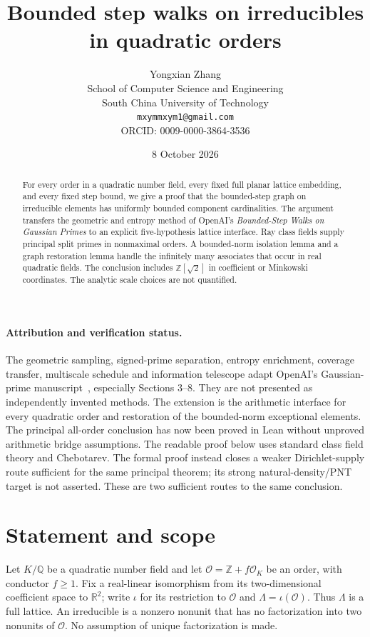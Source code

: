 \documentclass[11pt]{article}
\title{Bounded step walks on irreducibles in quadratic orders}
\author{Yongxian Zhang\\[2pt]\small School of Computer Science and Engineering\\\small South China University of Technology\\\small\texttt{mxymmxym1@gmail.com}\\\small ORCID: 0009-0000-3864-3536}
\date{8 October 2026}
\numberwithin{equation}{section}
\theoremstyle{definition}\newtheorem{definition}[theorem]{Definition}
\theoremstyle{remark}\newtheorem{remark}[theorem]{Remark}
\newcommand{\Z}{\mathbb Z}\newcommand{\Q}{\mathbb Q}\newcommand{\R}{\mathbb R}
\newcommand{\OO}{\mathcal O}\newcommand{\PP}{\mathcal P}
\begin{document}
\maketitle
\begin{abstract}
For every order in a quadratic number field, every fixed full planar lattice embedding, and every fixed step bound, we give a proof that the bounded-step graph on irreducible elements has uniformly bounded component cardinalities. The argument transfers the geometric and entropy method of OpenAI's \emph{Bounded-Step Walks on Gaussian Primes} to an explicit five-hypothesis lattice interface. Ray class fields supply principal split primes in nonmaximal orders. A bounded-norm isolation lemma and a graph restoration lemma handle the infinitely many associates that occur in real quadratic fields. The conclusion includes $\Z[\sqrt2]$ in coefficient or Minkowski coordinates. The analytic scale choices are not quantified.
\end{abstract}

\paragraph{Attribution and verification status.}
The geometric sampling, signed-prime separation, entropy enrichment, coverage
transfer, multiscale schedule and information telescope adapt OpenAI's
Gaussian-prime manuscript~\cite{openai}, especially Sections 3--8. They are
not presented as independently invented methods. The extension is the
arithmetic interface for every quadratic order and restoration of the
bounded-norm exceptional elements. The principal all-order conclusion has
now been proved in Lean without unproved arithmetic bridge assumptions.
The readable proof below uses standard class field theory and Chebotarev.
The formal proof instead closes a weaker Dirichlet-supply route sufficient
for the same principal theorem; its strong natural-density/PNT target is
not asserted. These are two sufficient routes to the same conclusion.

\section{Statement and scope}

Let $K/\Q$ be a quadratic number field and let $\OO=\Z+f\OO_K$ be an order, with conductor $f\ge1$. Fix a real-linear isomorphism from its two-dimensional coefficient space to $\R^2$; write $\iota$ for its restriction to $\OO$ and $\Lambda=\iota(\OO)$. Thus $\Lambda$ is a full lattice. An irreducible is a nonzero nonunit that has no factorization into two nonunits of $\OO$. No assumption of unique factorization is made.
\end{document}
